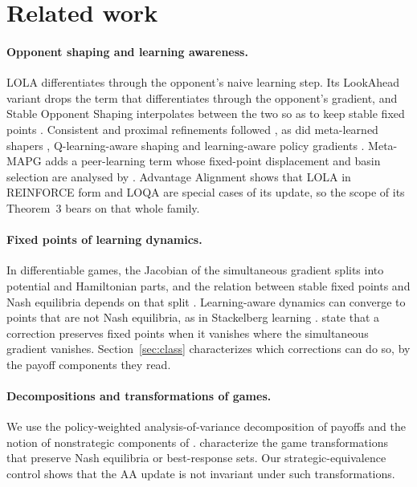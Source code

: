 \documentclass[11pt]{article}
\theoremstyle{remark}
\begin{document}
\section{Related work}\label{sec:related}

\paragraph{Opponent shaping and learning awareness.} LOLA \citep{foerster2018lola} differentiates through the opponent's naive learning step. Its LookAhead variant drops the term that differentiates through the opponent's gradient, and Stable Opponent Shaping interpolates between the two so as to keep stable fixed points \citep{letcher2019sos}. Consistent and proximal refinements followed \citep{willi2022cola,zhao2022pola}, as did meta-learned shapers \citep{lu2022mfos,khan2024shaper}, Q-learning-aware shaping \citep{aghajohari2024loqa} and learning-aware policy gradients \citep{meulemans2025learningaware}. Meta-MAPG \citep{kim2021metamapg} adds a peer-learning term whose fixed-point displacement and basin selection are analysed by \citet{shcherbinin2026basin}. Advantage Alignment \citep{duque2025aa} shows that LOLA in REINFORCE form and LOQA are special cases of its update, so the scope of its Theorem~3 bears on that whole family.

\paragraph{Fixed points of learning dynamics.} In differentiable games, the Jacobian of the simultaneous gradient splits into potential and Hamiltonian parts, and the relation between stable fixed points and Nash equilibria depends on that split \citep{balduzzi2018mechanics,letcher2019mechanics}. Learning-aware dynamics can converge to points that are not Nash equilibria, as in Stackelberg learning \citep{fiez2020stackelberg}. \citet{letcher2019sos} state that a correction preserves fixed points when it vanishes where the simultaneous gradient vanishes. Section~\ref{sec:class} characterizes which corrections can do so, by the payoff components they read.

\paragraph{Decompositions and transformations of games.} We use the policy-weighted analysis-of-variance decomposition of payoffs and the notion of nonstrategic components of \citet{candogan2011}. \citet{tewolde2024transformations} characterize the game transformations that preserve Nash equilibria or best-response sets. Our strategic-equivalence control shows that the AA update is not invariant under such transformations.
\end{document}
